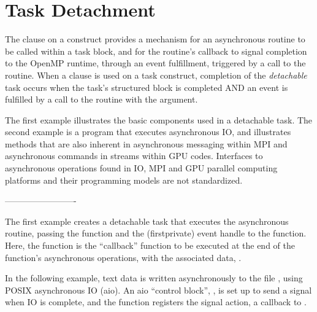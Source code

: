 \pagebreak
\section{Task Detachment}
\label{sec:task_detachment}


The  clause on a  construct provides a mechanism for an asynchronous
routine to be called within a task block, and for the routine's
callback to signal completion to the OpenMP runtime, through an 
event fulfillment, triggered by a call to the  routine.
When a  clause is used on a task construct,
completion of the \emph{detachable} task occurs when the task's structured
block is completed AND an  event is
fulfilled by a call to the  
routine with the  argument.

The first example illustrates the basic components used in a detachable task.
The second example is a program that executes asynchronous IO, and illustrates 
methods that are also inherent in asynchronous messaging within MPI and asynchronous commands in 
streams within GPU codes.
Interfaces to asynchronous operations found in IO, MPI and GPU parallel computing platforms
and their programming models are not standardized. 

-------------------------

The first example creates a detachable task
that executes the asynchronous  routine,
passing the  function and the (firstprivate) event handle
to the function. Here, the  function is
the ``callback'' function to be executed at the end of the  function's
asynchronous operations,
with the associated data, . 


\clearpage


In the following example, text data is written asynchronously to the file ,
using POSIX asynchronous IO (aio). An aio ``control block'', , is set up to
send a signal when IO is complete, and the  function registers
the signal action, a callback to .

